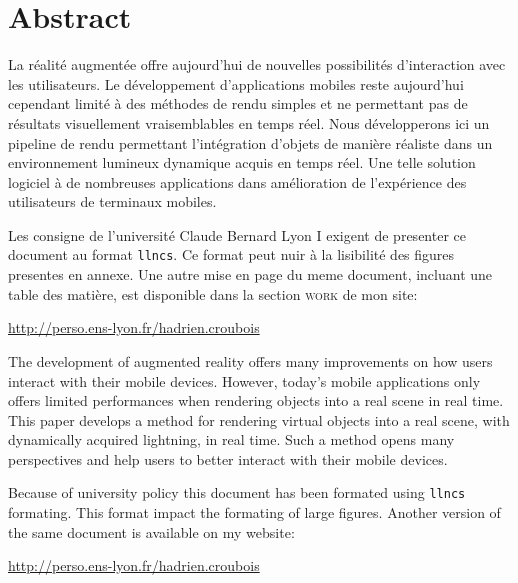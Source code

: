 \documentclass[10pt,a4paper,twoside, twocolumn]{report}
\begin{document}
\vfill

{}
\section*{Abstract}


  \vfill
  
	La réalité augmentée offre aujourd'hui de nouvelles possibilités d’interaction avec les utilisateurs. Le développement d'applications mobiles reste aujourd'hui cependant limité à des méthodes de rendu simples et ne permettant pas de résultats visuellement vraisemblables en temps réel. Nous développerons ici un pipeline de rendu permettant l’intégration d'objets de manière réaliste dans un environnement lumineux dynamique acquis en temps réel. Une telle solution logiciel à de nombreuses applications dans amélioration de l’expérience des utilisateurs de terminaux mobiles.

	\ifllncs
	Les consigne de l'université Claude Bernard Lyon I exigent de presenter ce document au format \texttt{llncs}. Ce format peut nuir à la lisibilité des figures presentes en annexe. Une autre mise en page du meme document, incluant une table des matière, est disponible dans la section \textsc{work} de mon site:

	\begin{center}\href{http://perso.ens-lyon.fr/hadrien.croubois}{http://perso.ens-lyon.fr/hadrien.croubois}\end{center}
	\fi

	\vspace{1cm}

	The development of augmented reality offers many improvements on how users interact with their mobile devices. However, today's mobile applications only offers limited performances when rendering objects into a real scene in real time. This paper develops a method for rendering virtual objects into a real scene, with dynamically acquired lightning, in real time. Such a method opens many perspectives and help users to better interact with their mobile devices.
	
	\ifllncs
	Because of university policy this document has been formated using \texttt{llncs} formating. This format impact the formating of large figures. Another version of the same document is available on my website:

	\begin{center}\href{http://perso.ens-lyon.fr/hadrien.croubois}{http://perso.ens-lyon.fr/hadrien.croubois}\end{center}
	\fi

  \vfill
\end{document}
